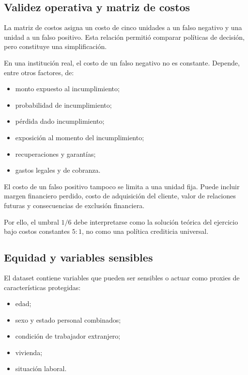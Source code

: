 \subsection{Validez operativa y matriz de costos}

La matriz de costos asigna un costo de cinco unidades a un falso negativo
y una unidad a un falso positivo. Esta relación permitió comparar
políticas de decisión, pero constituye una simplificación.

En una institución real, el costo de un falso negativo no es constante.
Depende, entre otros factores, de:

\begin{itemize}
    \item monto expuesto al incumplimiento;

    \item probabilidad de incumplimiento;

    \item pérdida dado incumplimiento;

    \item exposición al momento del incumplimiento;

    \item recuperaciones y garantías;

    \item gastos legales y de cobranza.
\end{itemize}

El costo de un falso positivo tampoco se limita a una unidad fija. Puede
incluir margen financiero perdido, costo de adquisición del cliente,
valor de relaciones futuras y consecuencias de exclusión financiera.

Por ello, el umbral \(1/6\) debe interpretarse como la solución teórica
del ejercicio bajo costos constantes \(5:1\), no como una política
crediticia universal.

\subsection{Equidad y variables sensibles}

El dataset contiene variables que pueden ser sensibles o actuar como
proxies de características protegidas:

\begin{itemize}
    \item edad;

    \item sexo y estado personal combinados;

    \item condición de trabajador extranjero;

    \item vivienda;

    \item situación laboral.
\end{itemize}

